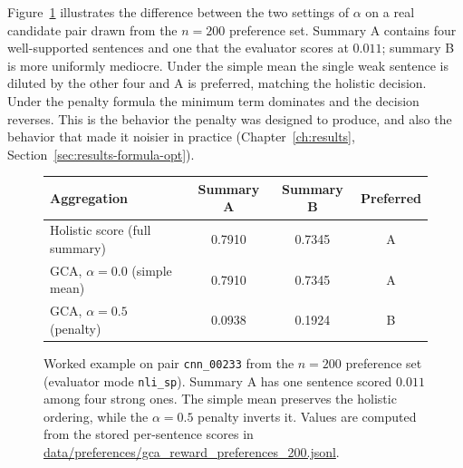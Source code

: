 Figure~\ref{fig:gca-worked} illustrates the difference between the two settings of
$\alpha$ on a real candidate pair drawn from the $n=200$ preference set. Summary A
contains four well-supported sentences and one that the evaluator scores at
$0.011$; summary B is more uniformly mediocre. Under the simple mean the single
weak sentence is diluted by the other four and A is preferred, matching the
holistic decision. Under the penalty formula the minimum term dominates and the
decision reverses. This is the behavior the penalty was designed to produce, and
also the behavior that made it noisier in practice
(Chapter~\ref{ch:results}, Section~\ref{sec:results-formula-opt}).

\begin{figure}[htbp]
\centering
{}

\vspace{0.6em}
\small
\begin{tabular}{lccc}
\toprule
Aggregation & Summary A & Summary B & Preferred \\
\midrule
Holistic score (full summary)      & 0.7910 & 0.7345 & A \\
GCA, $\alpha=0.0$ (simple mean)    & 0.7910 & 0.7345 & A \\
GCA, $\alpha=0.5$ (penalty)        & 0.0938 & 0.1924 & B \\
\bottomrule
\end{tabular}
\caption[Worked example: holistic scoring vs.\ GCA aggregation]{Worked example on pair \texttt{cnn\_00233} from the $n=200$ preference
set (evaluator mode \texttt{nli\_sp}). Summary A has one sentence scored $0.011$
among four strong ones. The simple mean preserves the holistic ordering, while
the $\alpha=0.5$ penalty inverts it. Values are computed from the stored
per-sentence scores in
\url{data/preferences/gca_reward_preferences_200.jsonl}.}
\label{fig:gca-worked}
\end{figure}

